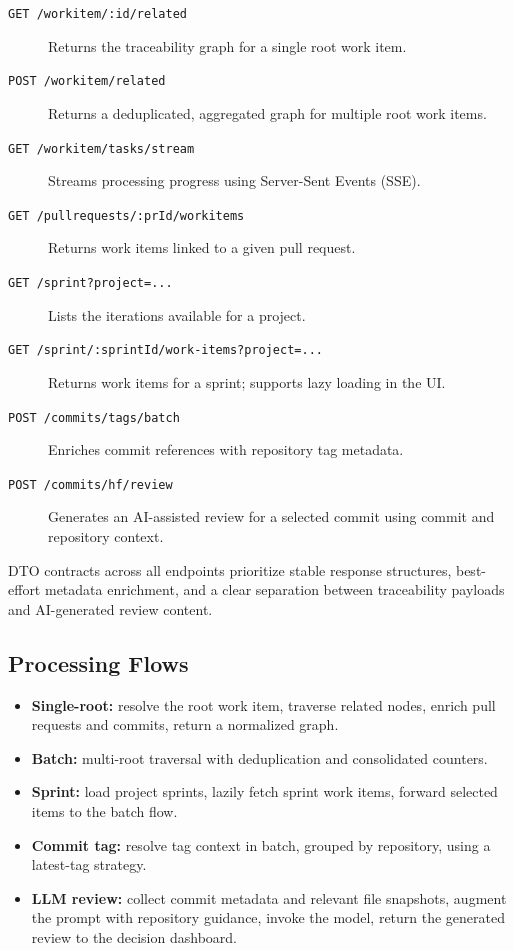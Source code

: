 \begin{description}
  \item[\texttt{GET /workitem/:id/related}]
  Returns the traceability graph for a single root work item.

  \item[\texttt{POST /workitem/related}]
  Returns a deduplicated, aggregated graph for multiple root work items.

  \item[\texttt{GET /workitem/tasks/stream}]
  Streams processing progress using Server-Sent Events (SSE).

  \item[\texttt{GET /pullrequests/:prId/workitems}]
  Returns work items linked to a given pull request.

  \item[\texttt{GET /sprint?project=...}]
  Lists the iterations available for a project.

  \item[\texttt{GET /sprint/:sprintId/work-items?project=...}]
  Returns work items for a sprint; supports lazy loading in the UI.

  \item[\texttt{POST /commits/tags/batch}]
  Enriches commit references with repository tag metadata.

  \item[\texttt{POST /commits/hf/review}]
  Generates an AI-assisted review for a selected commit using commit and
  repository context.
\end{description}

DTO contracts across all endpoints prioritize stable response structures,
best-effort metadata enrichment, and a clear separation between traceability
payloads and AI-generated review content.

\subsection{Processing Flows}

\begin{itemize}
  \item \textbf{Single-root:} resolve the root work item, traverse related
  nodes, enrich pull requests and commits, return a normalized graph.
  \item \textbf{Batch:} multi-root traversal with deduplication and
  consolidated counters.
  \item \textbf{Sprint:} load project sprints, lazily fetch sprint work items,
  forward selected items to the batch flow.
  \item \textbf{Commit tag:} resolve tag context in batch, grouped by
  repository, using a latest-tag strategy.
  \item \textbf{LLM review:} collect commit metadata and relevant file
  snapshots, augment the prompt with repository guidance, invoke the model,
  return the generated review to the decision dashboard.
\end{itemize}

